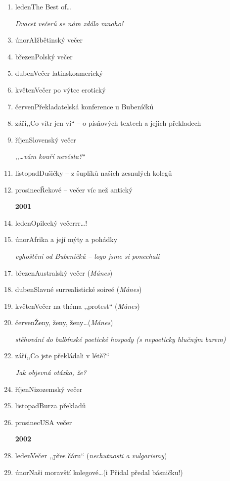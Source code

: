 \begin{enumerate}
 \item leden\quad The Best of\ldots 
 \item[] \textit{Dvacet večerů se nám zdálo mnoho!}
 \item únor\quad Alžbětinský večer
 \item březen\quad Polský večer
 \item duben\quad Večer latinskoamerický
 \item květen\quad Večer po výtce erotický 
 \item červen\quad Překladatelská konference u Bubeníčků
 \item září\quad ,,Co vítr jen ví`` -- o písňových textech a jejich překladech
 \item říjen\quad Slovenský večer 
 \item[] ,,\textit{\ldots vám kouří nevěsta?}``
 \item listopad\quad Dušičky -- z šuplíků našich zesnulých kolegů
 \item prosinec\quad Řekové -- večer víc než antický
 \item[\textbf{2001}]
 \item leden\quad Opilecký večerrr\ldots!
 \item únor\quad Afrika a její mýty a pohádky
 \item[] \textit{vyhoštěni od Bubeníčků -- logo jsme si ponechali}
 \item březen\quad Australský večer (\textit{Mánes})
 \item duben\quad Slavné surrealistické soireé (\textit{Mánes})
 \item květen\quad Večer na théma ,,protest`` (\textit{Mánes})
 \item červen\quad Ženy, ženy, ženy\ldots (\textit{Mánes})
 \item[] \textit{stěhování do balbínské poetické hospody (s nepoeticky hlučným barem)}
 \item září\quad ,,Co jste překládali v létě?``
 \item[] \textit{Jak objevná otázka, že?}
 \item říjen\quad Nizozemský večer
 \item listopad\quad Burza překladů
 \item prosinec\quad USA večer
 \item[\textbf{2002}]
 \item leden\quad Večer ,,přes čáru`` (\textit{nechutnosti a vulgarismy})
 \item únor\quad Naši moravští kolegové\ldots (i Přidal předal básničku!)

\end{enumerate}
